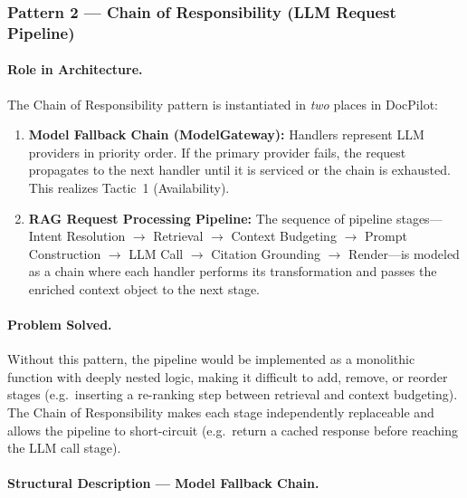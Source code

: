 \documentclass[12pt,a4paper]{article}
\begin{document}
\subsubsection{Pattern 2 --- Chain of Responsibility (LLM Request Pipeline)}

\paragraph{Role in Architecture.}
The Chain of Responsibility pattern is instantiated in \textit{two} places in DocPilot:

\begin{enumerate}[nosep]
    \item \textbf{Model Fallback Chain (ModelGateway):} Handlers represent LLM providers in
    priority order. If the primary provider fails, the request propagates to the next handler
    until it is serviced or the chain is exhausted. This realizes Tactic~1 (Availability).

    \item \textbf{RAG Request Processing Pipeline:} The sequence of pipeline stages---Intent
    Resolution $\to$ Retrieval $\to$ Context Budgeting $\to$ Prompt Construction $\to$ LLM
    Call $\to$ Citation Grounding $\to$ Render---is modeled as a chain where each handler
    performs its transformation and passes the enriched context object to the next stage.
\end{enumerate}

\paragraph{Problem Solved.}
Without this pattern, the pipeline would be implemented as a monolithic function with deeply
nested logic, making it difficult to add, remove, or reorder stages (e.g.\ inserting a
re-ranking step between retrieval and context budgeting). The Chain of Responsibility makes each
stage independently replaceable and allows the pipeline to short-circuit (e.g.\ return a cached
response before reaching the LLM call stage).

\paragraph{Structural Description --- Model Fallback Chain.}
\end{document}
